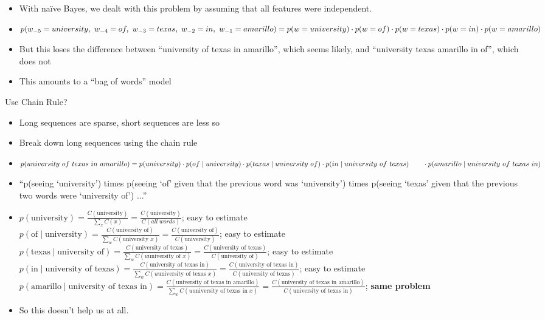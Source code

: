 \documentclass[11pt,letterpaper]{article}
\begin{document}
\begin{itemize}
  \item With na\"{i}ve Bayes, we dealt with this problem by assuming that all features were independent.
  \item $p(w_{-5}=university, ~ w_{-4}=of, ~ w_{-3}=texas, ~ w_{-2}=in, ~ w_{-1}=amarillo) = \\
         p(w=university) \cdot p(w=of) \cdot p(w=texas) \cdot p(w=in) \cdot p(w=amarillo)$
  \item But this loses the difference between ``university of texas in amarillo'', which seems likely, and ``university texas amarillo in of'', which does not
  \item This amounts to a ``bag of words'' model
\end{itemize}

Use Chain Rule?

\begin{itemize}
  \item Long sequences are sparse, short sequences are less so
  \item Break down long sequences using the chain rule
  \item $p(university~of~texas~in~amarillo) = \\
         p(university) \cdot 
         p(of \mid university) \cdot 
         p(texas \mid university~of) \cdot 
         p(in \mid university~of~texas) \\
  ~~~~~~ \cdot p(amarillo \mid university~of~texas~in)$
  \item ``p(seeing `university') times p(seeing `of' given that the previous word was `university') times p(seeing `texas' given that the previous two words were `university of') ...''
  \item 
     $p(\text{university}) = 
     \frac{C(\text{university})}{\sum_x C(x)} = 
     \frac{C(\text{university})}{C(all~words)}$; easy to estimate
  \\ $p(\text{of} \mid \text{university}) = 
     \frac{C(\text{university of})}{\sum_w C(\text{university } x)} = 
     \frac{C(\text{university of})}{C(\text{university})}$; easy to estimate
  \\ $p(\text{texas} \mid \text{university of}) = 
     \frac{C(\text{university of texas})}{\sum_w C(u\text{university of } x)} = 
     \frac{C(\text{university of texas})}{C(\text{university of})}$; easy to estimate
  \\ $p(\text{in} \mid \text{university of texas}) = 
     \frac{C(\text{university of texas in})}{\sum_w C(u\text{university of texas } x)} = 
     \frac{C(\text{university of texas in})}{C(\text{university of texas})}$; easy to estimate
  \\ $p(\text{amarillo} \mid \text{university of texas in}) = 
     \frac{C(\text{university of texas in amarillo})}{\sum_w C(u\text{university of texas in } x)} = 
     \frac{C(\text{university of texas in amarillo})}{C(\text{university of texas in})}$; \textbf{same problem}
  \item So this doesn't help us at all.
\end{itemize}
\end{document}
